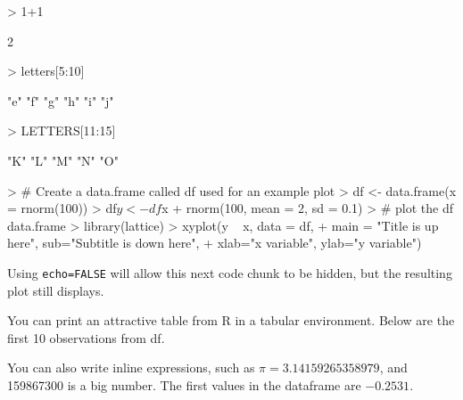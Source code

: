 \documentclass[letterpaper,12pt]{article}
\begin{document}
\begin{Schunk}
\begin{Sinput}
> 1+1
\end{Sinput}
\begin{Soutput}
[1] 2
\end{Soutput}
\begin{Sinput}
> letters[5:10]
\end{Sinput}
\begin{Soutput}
[1] "e" "f" "g" "h" "i" "j"
\end{Soutput}
\begin{Sinput}
> LETTERS[11:15]
\end{Sinput}
\begin{Soutput}
[1] "K" "L" "M" "N" "O"
\end{Soutput}
\begin{Sinput}
> # Create a data.frame called df used for an example plot
> df <- data.frame(x = rnorm(100))
> df$y <- df$x + rnorm(100, mean = 2, sd = 0.1)
> # plot the df data.frame
> library(lattice)
> xyplot(y ~ x, data = df,
+        main = "Title is up here", sub="Subtitle is down here",
+        xlab="x variable", ylab="y variable")
\end{Sinput}
\end{Schunk}

Using \verb|echo=FALSE| will allow this next code chunk to be hidden,
  but the resulting plot still displays.


You can print an attractive table from R in a tabular environment.
Below are the first 10 observations from df.


You can also write inline expressions,
  such as $\pi=3.14159265358979$, and 159867300 is a big number.
The first values in the dataframe are $-0.2531$.
\end{document}
